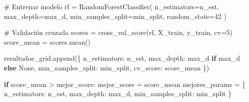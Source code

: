 \documentclass[
  doc,
  floatsintext,
  longtable,
  a4paper,
  nolmodern,
  notxfonts,
  notimes,
  12pt,
  colorlinks=true,linkcolor=blue,citecolor=blue,urlcolor=blue]{apa7}
\newenvironment{Shaded}{\begin{snugshade}}{\end{snugshade}}
\newcommand{\CommentTok}[1]{\textcolor[rgb]{0.37,0.37,0.37}{#1}}
\newcommand{\ControlFlowTok}[1]{\textcolor[rgb]{0.00,0.23,0.31}{\textbf{#1}}}
\newcommand{\DecValTok}[1]{\textcolor[rgb]{0.68,0.00,0.00}{#1}}
\newcommand{\NormalTok}[1]{\textcolor[rgb]{0.00,0.23,0.31}{#1}}
\newcommand{\OperatorTok}[1]{\textcolor[rgb]{0.37,0.37,0.37}{#1}}
\newcommand{\StringTok}[1]{\textcolor[rgb]{0.13,0.47,0.30}{#1}}
\begin{document}
\begin{Shaded}
\begin{Highlighting}[]
            \CommentTok{\# Entrenar modelo}
\NormalTok{            rf }\OperatorTok{=}\NormalTok{ RandomForestClassifier(}
\NormalTok{                n\_estimators}\OperatorTok{=}\NormalTok{n\_est,}
\NormalTok{                max\_depth}\OperatorTok{=}\NormalTok{max\_d,}
\NormalTok{                min\_samples\_split}\OperatorTok{=}\NormalTok{min\_split,}
\NormalTok{                random\_state}\OperatorTok{=}\DecValTok{42}
\NormalTok{            )}
            
            \CommentTok{\# Validación cruzada}
\NormalTok{            scores }\OperatorTok{=}\NormalTok{ cross\_val\_score(rf, X\_train, y\_train, cv}\OperatorTok{=}\DecValTok{5}\NormalTok{)}
\NormalTok{            score\_mean }\OperatorTok{=}\NormalTok{ scores.mean()}
            
\NormalTok{            resultados\_grid.append(\{}
                \StringTok{\textquotesingle{}n\_estimators\textquotesingle{}}\NormalTok{: n\_est,}
                \StringTok{\textquotesingle{}max\_depth\textquotesingle{}}\NormalTok{: max\_d }\ControlFlowTok{if}\NormalTok{ max\_d }\ControlFlowTok{else} \StringTok{\textquotesingle{}None\textquotesingle{}}\NormalTok{,}
                \StringTok{\textquotesingle{}min\_samples\_split\textquotesingle{}}\NormalTok{: min\_split,}
                \StringTok{\textquotesingle{}cv\_score\textquotesingle{}}\NormalTok{: score\_mean}
\NormalTok{            \})}
            
            \ControlFlowTok{if}\NormalTok{ score\_mean }\OperatorTok{\textgreater{}}\NormalTok{ mejor\_score:}
\NormalTok{                mejor\_score }\OperatorTok{=}\NormalTok{ score\_mean}
\NormalTok{                mejores\_params }\OperatorTok{=}\NormalTok{ \{}
                    \StringTok{\textquotesingle{}n\_estimators\textquotesingle{}}\NormalTok{: n\_est,}
                    \StringTok{\textquotesingle{}max\_depth\textquotesingle{}}\NormalTok{: max\_d,}
                    \StringTok{\textquotesingle{}min\_samples\_split\textquotesingle{}}\NormalTok{: min\_split}
\NormalTok{                \}}


\end{Highlighting}
\end{Shaded}
\end{document}
